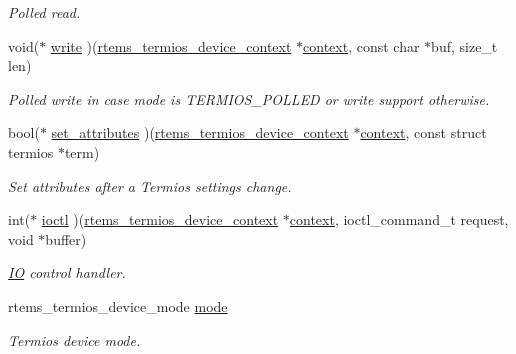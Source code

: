 \begin{DoxyCompactItemize}
\begin{DoxyCompactList}\small\item\em Polled read. \end{DoxyCompactList}\item 
void($\ast$ \mbox{\hyperlink{structrtems__termios__device__handler_ad7ba7863ddae9efc137b1329b6d41a9d}{write}} )(\mbox{\hyperlink{structrtems__termios__device__context}{rtems\+\_\+termios\+\_\+device\+\_\+context}} $\ast$\mbox{\hyperlink{sun4u_2tte_8h_a9b4a99475e2709333b8e5d70483173f1}{context}}, const char $\ast$buf, size\+\_\+t len)
\begin{DoxyCompactList}\small\item\em Polled write in case mode is T\+E\+R\+M\+I\+O\+S\+\_\+\+P\+O\+L\+L\+ED or write support otherwise. \end{DoxyCompactList}\item 
bool($\ast$ \mbox{\hyperlink{structrtems__termios__device__handler_a6e409b0489e333c114a9a0aafd2ae4cb}{set\+\_\+attributes}} )(\mbox{\hyperlink{structrtems__termios__device__context}{rtems\+\_\+termios\+\_\+device\+\_\+context}} $\ast$\mbox{\hyperlink{sun4u_2tte_8h_a9b4a99475e2709333b8e5d70483173f1}{context}}, const struct termios $\ast$term)
\begin{DoxyCompactList}\small\item\em Set attributes after a Termios settings change. \end{DoxyCompactList}\item 
int($\ast$ \mbox{\hyperlink{structrtems__termios__device__handler_ae9eebdf89a22921b0250d3214066a3aa}{ioctl}} )(\mbox{\hyperlink{structrtems__termios__device__context}{rtems\+\_\+termios\+\_\+device\+\_\+context}} $\ast$\mbox{\hyperlink{sun4u_2tte_8h_a9b4a99475e2709333b8e5d70483173f1}{context}}, ioctl\+\_\+command\+\_\+t request, void $\ast$buffer)
\begin{DoxyCompactList}\small\item\em \mbox{\hyperlink{structIO}{IO}} control handler. \end{DoxyCompactList}\item 
\mbox{\label{structrtems__termios__device__handler_a39204bdaac81a35704def6a3a933657a}} 
rtems\+\_\+termios\+\_\+device\+\_\+mode \mbox{\hyperlink{structrtems__termios__device__handler_a39204bdaac81a35704def6a3a933657a}{mode}}
\begin{DoxyCompactList}\small\item\em Termios device mode. \end{DoxyCompactList}\end{DoxyCompactItemize}


